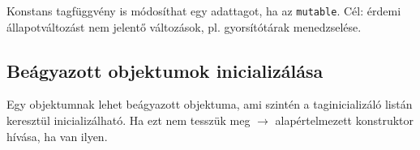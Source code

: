 \documentclass[usenames,dvipsnames,aspectratio=169]{beamer}
\begin{document}
\begin{frame}
    \begin{exampleblock}{}
        \scriptsize
        
    \end{exampleblock}
\end{frame}

\begin{frame}
    Konstans tagfüggvény is módosíthat egy adattagot, ha az \texttt{mutable}. Cél: érdemi állapotváltozást nem jelentő változások, pl. gyorsítótárak menedzselése.
    \begin{exampleblock}{}
        
    \end{exampleblock}
\end{frame}

\begin{frame}
    \begin{exampleblock}{}
        \scriptsize
        
    \end{exampleblock}
\end{frame}

\subsection{Beágyazott objektumok inicializálása}

\begin{frame}
    Egy objektumnak lehet beágyazott objektuma, ami szintén a taginicializáló listán keresztül inicializálható. Ha ezt nem tesszük meg $\to$ alapértelmezett konstruktor hívása, ha van ilyen.
    \begin{exampleblock}{}
        
    \end{exampleblock}
\end{frame}

\begin{frame}
    \begin{exampleblock}{}
        \scriptsize
        
    \end{exampleblock}
\end{frame}

\begin{frame}
    \begin{exampleblock}{}
        \small
        
    \end{exampleblock}
\end{frame}
\end{document}
